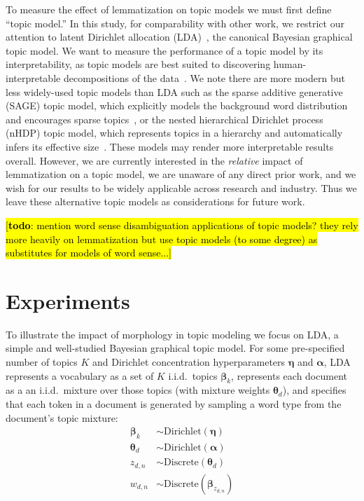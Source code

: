 \documentclass[11pt,letterpaper]{article}
\renewcommand{\vec}{\boldsymbol}   %
\newcommand{\valpha}{{\vec{\alpha}}}
\newcommand{\vtheta}{{\vec{\theta}}}
\newcommand{\veta}{{\vec{\eta}}}
\newcommand{\vbeta}{{\vec{\beta}}}
\newcommand{\Discrete}{\ensuremath{\mathrm{Discrete}}}
\newcommand{\Dirichlet}{\ensuremath{\mathrm{Dirichlet}}}
\newcommand{\Note}[3]{\sethlcolor{#2}\hl{[\textbf{#1}: #3]}}
\newcommand{\todo}[1]{\Note{todo}{red}{#1}}
\begin{document}
{To measure the effect of lemmatization on topic models we must first
define ``topic model.''  In this study, for comparability with other
work, we restrict our attention to latent Dirichlet allocation
(LDA)~\cite{blei2003}, the canonical Bayesian graphical topic model.
We want to measure the performance of a topic model by its
interpretability, as topic models are best suited to discovering
human-interpretable decompositions of the data~\cite{may2015}.
We note there are more modern but less widely-used topic models than
LDA such as the sparse additive generative
(SAGE) topic model, which explicitly models the background word
distribution and encourages sparse topics~\cite{eisenstein2011}, or the
nested hierarchical Dirichlet process (nHDP) topic model, which
represents topics in a hierarchy and automatically infers its effective
size~\cite{paisley2015}.  These models may render more interpretable
results overall.  However, we are currently interested in the
\emph{relative} impact of lemmatization on a topic model, we are
unaware of any direct prior work, and we wish for our results to be
widely applicable across research and industry.  Thus we leave these
alternative topic models as considerations for future work.

\todo{mention word sense disambiguation applications of topic models?
    they rely more heavily on lemmatization but use topic models (to
    some degree) as substitutes for models of word sense...}


\section{Experiments}\label{sec:experiments}

To illustrate the impact of morphology in topic modeling we focus on
LDA, a simple and well-studied Bayesian graphical topic model.
For some pre-specified
number of topics $K$ and Dirichlet concentration hyperparameters
$\veta$ and $\valpha$, LDA represents a vocabulary as a set of $K$
i.i.d.\ topics $\vbeta_k$, represents each document as a
an i.i.d.\ mixture over those topics (with mixture weights
$\vtheta_d$), and specifies that each token in a document is
generated by sampling a word type from the document's topic mixture:
\begin{align*}
    \vbeta_k  & \sim \Dirichlet\left(\veta\right) \\
    \vtheta_d & \sim \Dirichlet\left(\valpha\right) \\
    z_{d,n}              & \sim \Discrete\left(\vtheta_d\right) \\
    w_{d,n}              & \sim \Discrete\left(\vbeta_{z_{d,n}}\right)
\end{align*}

}
\end{document}
